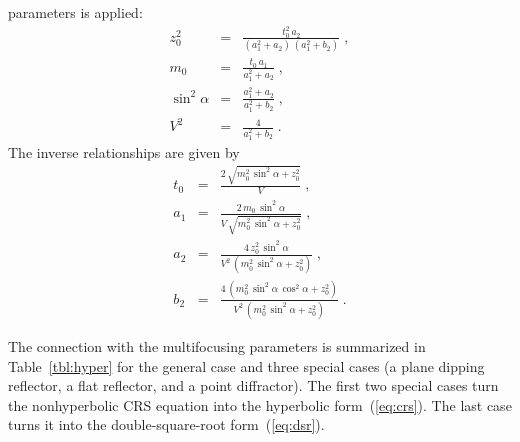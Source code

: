 parameters is applied:
\begin{eqnarray}
\label{eq:z0} 
z_0^2 & = & \frac{t_0^2\,a_2}{(a_1^2+a_2)\,(a_1^2+b_2)}\;, \\
 \label{eq:m} 
m_0 & = & \frac{t_0\,a_1}{a_1^2+a_2}\;, \\
\label{eq:alpha} 
\sin^2{\alpha} & = & \frac{a_1^2 + a_2}{a_1^2 + b_2}\;, \\
\label{eq:v} 
V^2 & = & \frac{4}{a_1^2 + b_2}\;.
\end{eqnarray}
The inverse relationships are given by
\begin{eqnarray}
\label{eq:t0i} 
t_0 & = & \frac{2\,\sqrt{m_0^2\,\sin^2{\alpha} + z_0^2}}{V}\;, \\
 \label{eq:a1i} 
a_1 & = & \frac{2\,m_0\,\sin^2{\alpha}}{V\,\sqrt{m_0^2\,\sin^2{\alpha} + z_0^2}}\;, \\
\label{eq:a2i} 
a_2 & = & \frac{4\,z_0^2\,\sin^2{\alpha}}{V^2\,\left(m_0^2\,\sin^2{\alpha} + z_0^2\right)}\;, \\
\label{eq:b2i} 
b_2 & = & \frac{4\,\left(m_0^2\,\sin^2{\alpha}\,\cos^2{\alpha}+z_0^2\right)}{V^2\,\left(m_0^2\,\sin^2{\alpha} + z_0^2\right)}\;.
\end{eqnarray}

The connection with the multifocusing parameters is summarized in
  Table~\ref{tbl:hyper} for the general case and three special cases
  (a plane dipping reflector, a flat reflector, and a point
  diffractor). The first two special cases turn the nonhyperbolic CRS
  equation into the hyperbolic form~(\ref{eq:crs}). The last case
  turns it into the double-square-root form~(\ref{eq:dsr}).

